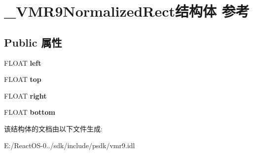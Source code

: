 \hypertarget{struct___v_m_r9_normalized_rect}{}\section{\+\_\+\+V\+M\+R9\+Normalized\+Rect结构体 参考}
\label{struct___v_m_r9_normalized_rect}
\subsection*{Public 属性}
\begin{DoxyCompactItemize}
\item 
\mbox{\label{struct___v_m_r9_normalized_rect_aab96edda868ae5d7442b5de34b31d505}} 
F\+L\+O\+AT {\bfseries left}
\item 
\mbox{\label{struct___v_m_r9_normalized_rect_a5c8b134d17c59bcfe78bae5c1d1bd621}} 
F\+L\+O\+AT {\bfseries top}
\item 
\mbox{\label{struct___v_m_r9_normalized_rect_a001fb774e7fa4f3b8ba87e1a8b0bf98c}} 
F\+L\+O\+AT {\bfseries right}
\item 
\mbox{\label{struct___v_m_r9_normalized_rect_a02f4655ea1bb2fd94c3d61f9a8de58ce}} 
F\+L\+O\+AT {\bfseries bottom}
\end{DoxyCompactItemize}


该结构体的文档由以下文件生成\+:\begin{DoxyCompactItemize}
\item 
E\+:/\+React\+O\+S-\/0../sdk/include/psdk/vmr9.\+idl\end{DoxyCompactItemize}
